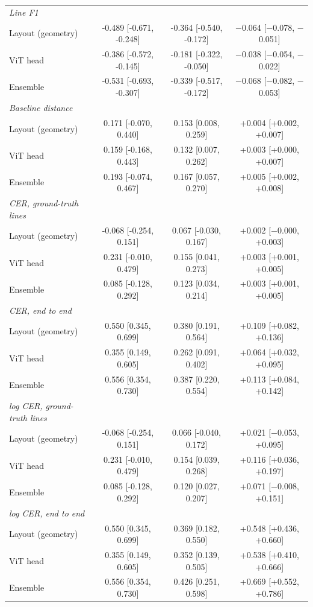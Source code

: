 \begin{table}[htbp]
\begin{tabular}{lccc}
    \midrule
    \textit{Line F1} &  &  &  \\
    Layout (geometry) & -0.489 [-0.671, -0.248] & -0.364 [-0.540, -0.172] & $-$0.064 [$-$0.078, $-$0.051] \\
    ViT head & -0.386 [-0.572, -0.145] & -0.181 [-0.322, -0.050] & $-$0.038 [$-$0.054, $-$0.022] \\
    Ensemble & -0.531 [-0.693, -0.307] & -0.339 [-0.517, -0.172] & $-$0.068 [$-$0.082, $-$0.053] \\
    \midrule
    \textit{Baseline distance} &  &  &  \\
    Layout (geometry) & 0.171 [-0.070, 0.440] & 0.153 [0.008, 0.259] & +0.004 [+0.002, +0.007] \\
    ViT head & 0.159 [-0.168, 0.443] & 0.132 [0.007, 0.262] & +0.003 [+0.000, +0.007] \\
    Ensemble & 0.193 [-0.074, 0.467] & 0.167 [0.057, 0.270] & +0.005 [+0.002, +0.008] \\
    \midrule
    \textit{CER, ground-truth lines} &  &  &  \\
    Layout (geometry) & -0.068 [-0.254, 0.151] & 0.067 [-0.030, 0.167] & +0.002 [$-$0.000, +0.003] \\
    ViT head & 0.231 [-0.010, 0.479] & 0.155 [0.041, 0.273] & +0.003 [+0.001, +0.005] \\
    Ensemble & 0.085 [-0.128, 0.292] & 0.123 [0.034, 0.214] & +0.003 [+0.001, +0.005] \\
    \midrule
    \textit{CER, end to end} &  &  &  \\
    Layout (geometry) & 0.550 [0.345, 0.699] & 0.380 [0.191, 0.564] & +0.109 [+0.082, +0.136] \\
    ViT head & 0.355 [0.149, 0.605] & 0.262 [0.091, 0.402] & +0.064 [+0.032, +0.095] \\
    Ensemble & 0.556 [0.354, 0.730] & 0.387 [0.220, 0.554] & +0.113 [+0.084, +0.142] \\
    \midrule
    \textit{log CER, ground-truth lines} &  &  &  \\
    Layout (geometry) & -0.068 [-0.254, 0.151] & 0.066 [-0.040, 0.172] & +0.021 [$-$0.053, +0.095] \\
    ViT head & 0.231 [-0.010, 0.479] & 0.154 [0.039, 0.268] & +0.116 [+0.036, +0.197] \\
    Ensemble & 0.085 [-0.128, 0.292] & 0.120 [0.027, 0.207] & +0.071 [$-$0.008, +0.151] \\
    \midrule
    \textit{log CER, end to end} &  &  &  \\
    Layout (geometry) & 0.550 [0.345, 0.699] & 0.369 [0.182, 0.550] & +0.548 [+0.436, +0.660] \\
    ViT head & 0.355 [0.149, 0.605] & 0.352 [0.139, 0.505] & +0.538 [+0.410, +0.666] \\
    Ensemble & 0.556 [0.354, 0.730] & 0.426 [0.251, 0.598] & +0.669 [+0.552, +0.786] \\
    \bottomrule
  \end{tabular}
\end{table}
